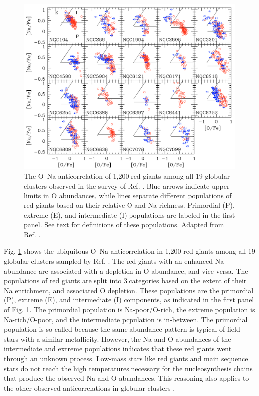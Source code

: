\begin{figure}[t]
\centering
\includegraphics[width=6.5in]{Chapter-1/figs/O-Na.png}
\caption{\label{fig:O-Na}The O--Na anticorrelation of 1,200 red giants among all 19 globular clusters observed in the survey of Ref. \cite{Carretta2010}. Blue arrows indicate upper limits in O abundances, while lines separate different populations of red giants based on their relative O and Na richness. Primordial (P), extreme (E), and intermediate (I) populations are labeled in the first panel. See text for definitions of these populations. Adapted from Ref. \cite{Carretta2010}.}
\end{figure}

Fig. \ref{fig:O-Na} shows the ubiquitous O--Na anticorrelation in 1,200 red giants among all 19 globular clusters sampled by Ref. \cite{Carretta2010}. The red giants with an enhanced Na abundance are associated with a depletion in O abundance, and vice versa. The populations of red giants are split into 3 categories based on the extent of their Na enrichment, and associated O depletion. These populations are the primordial (P), extreme (E), and intermediate (I) components, as indicated in the first panel of Fig. \ref{fig:O-Na}. The primordial population is Na-poor/O-rich, the extreme population is Na-rich/O-poor, and the intermediate population is in-between. The primordial population is so-called because the same abundance pattern is typical of field stars with a similar metallicity. However, the Na and O abundances of the intermediate and extreme populations indicates that these red giants went through an unknown process. Low-mass stars like red giants and main sequence stars do not reach the high temperatures necessary for the nucleosynthesis chains that produce the observed Na and O abundances. This reasoning also applies to the other observed anticorrelations in globular clusters \cite{Prantzos2007}.

